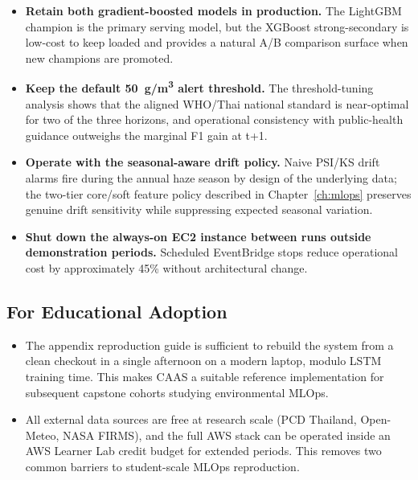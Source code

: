 \begin{itemize}
    \item \textbf{Retain both gradient-boosted models in production.}
          The LightGBM champion is the primary serving model, but the
          XGBoost strong-secondary is low-cost to keep loaded and
          provides a natural A/B comparison surface when new champions
          are promoted.

    \item \textbf{Keep the default 50~\textmu g/m\textsuperscript{3}
          alert threshold.} The threshold-tuning analysis shows that
          the aligned WHO/Thai national standard is near-optimal for
          two of the three horizons, and operational consistency with
          public-health guidance outweighs the marginal F1 gain at t+1.

    \item \textbf{Operate with the seasonal-aware drift policy.}
          Naive PSI/KS drift alarms fire during the annual haze season
          by design of the underlying data; the two-tier core/soft
          feature policy described in Chapter~\ref{ch:mlops} preserves
          genuine drift sensitivity while suppressing expected seasonal
          variation.

    \item \textbf{Shut down the always-on EC2 instance between runs
          outside demonstration periods.} Scheduled EventBridge stops
          reduce operational cost by approximately 45\% without
          architectural change.
\end{itemize}

\subsection{For Educational Adoption}

\begin{itemize}
    \item The appendix reproduction guide is sufficient to rebuild the
          system from a clean checkout in a single afternoon on a
          modern laptop, modulo LSTM training time. This makes CAAS a
          suitable reference implementation for subsequent capstone
          cohorts studying environmental MLOps.

    \item All external data sources are free at research scale (PCD
          Thailand, Open-Meteo, NASA FIRMS), and the full AWS stack can
          be operated inside an AWS Learner Lab credit budget for
          extended periods. This removes two common barriers to
          student-scale MLOps reproduction.
\end{itemize}

